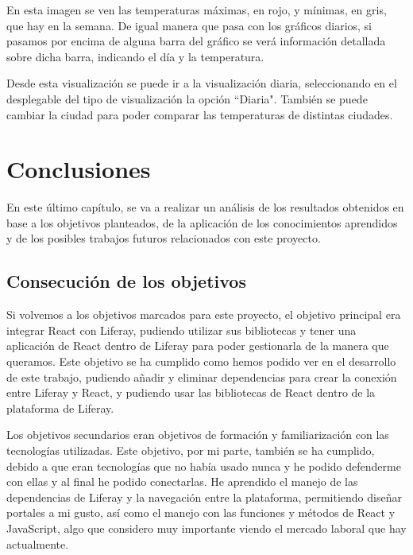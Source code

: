 \documentclass[a4paper, 12pt]{book}
\begin{document}
En esta imagen se ven las temperaturas máximas, en rojo, y mínimas, en gris, que hay en la semana. De igual manera que pasa con los gráficos diarios, si pasamos por encima de alguna barra del gráfico se verá información detallada sobre dicha barra, indicando el día y la temperatura.

\vspace{5mm}
Desde esta visualización se puede ir a la visualización diaria, seleccionando en el desplegable del tipo de visualización la opción ``Diaria". También se puede cambiar la ciudad para poder comparar las temperaturas de distintas ciudades.





\cleardoublepage
\chapter{Conclusiones}
\label{chap:conclusiones}
En este último capítulo, se va a realizar un análisis de los resultados obtenidos en base a los objetivos planteados, de la aplicación de los conocimientos aprendidos y de los posibles trabajos futuros relacionados con este proyecto.

\section{Consecución de los objetivos}
\label{sec:consecucion_objectivos}
Si volvemos a los objetivos marcados para este proyecto, el objetivo principal era integrar React con Liferay, pudiendo utilizar sus bibliotecas y tener una aplicación de React dentro de Liferay para poder gestionarla de la manera que queramos. Este objetivo se ha cumplido como hemos podido ver en el desarrollo de este trabajo, pudiendo añadir y eliminar dependencias para crear la conexión entre Liferay y React, y pudiendo usar las bibliotecas de React dentro de la plataforma de Liferay.

\vspace{5mm}
Los objetivos secundarios eran objetivos de formación y familiarización con las tecnologías utilizadas. Este objetivo, por mi parte, también se ha cumplido, debido a que eran tecnologías que no había usado nunca y he podido defenderme con ellas y al final he podido conectarlas. He aprendido el manejo de las dependencias de Liferay y la navegación entre la plataforma, permitiendo diseñar portales a mi gusto, así como el manejo con las funciones y métodos de React y JavaScript, algo que considero muy importante viendo el mercado laboral que hay actualmente.
\end{document}
